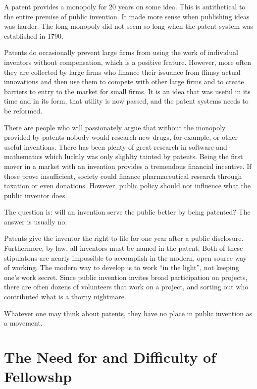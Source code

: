 \documentclass[
	fontsize=10pt, %
	twoside=false, %
	secnumdepth=1, %
]{kaobook}
\begin{document}
A patent provides a monopoly for 20 years on some idea.
This is antithetical to the entire premise of public invention.
It made more sense when publishing ideas was harder.
The long monopoly did not seem so long when the patent system
was established in 1790.

Patents do occasionally prevent large firms from using the
work of individual inventors without compensation, which
is a positive feature. However, more often they are collected
by large firms who finance their issuance from flimsy actual
innovations and then use them to compete with other large firms
and to create barriers to entry to the market for small firms.
It is an idea that was useful in its time and in its form,
that utility is now passed, and the patent systems needs
to be reformed.

There are people who will passionately argue that without
the monopoly provided by patents nobody would research new
drugs, for example, or other useful inventions.
There has been plenty of great research in software and
mathematics which luckily was only slighlty tainted by patents.
Being the first mover in a market with an invention provides
a tremendous financial incentive.
If those prove insufficient, society could finance
pharmaceutical research through taxation or
even donations.
However, public policy should not influence
what the public inventor does.

The question is: will an invention serve the public better
by being patented? The answer is usually no.

Patents give the inventor the right to file for one year
after a public disclosure. Furthermore, by law,
all inventors must be named in the patent. Both
of these stipulatons are nearly impossible to accomplish
in the modern, open-source way of working.
The modern way to develop is to work ``in the light'',
not keeping one's work secret.
Since public invention invites broad participation on projects,
there are often dozens of volunteers that work on a project,
and sorting out who contributed what is a thorny nightmare.

Whatever one may think about patents, they have no
place in public invention as a movement.

\section{The Need for and Difficulty of Fellowshp}
\end{document}

